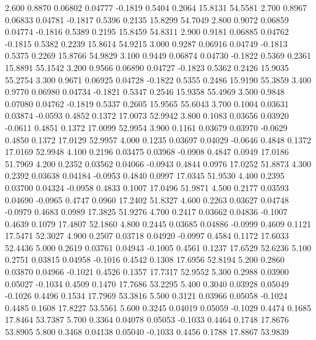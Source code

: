    2.600   0.8870   0.06802   0.04777  -0.1819   0.5404   0.2064  15.8131  54.5581
   2.700   0.8967   0.06833   0.04781  -0.1817   0.5396   0.2135  15.8299  54.7049
   2.800   0.9072   0.06859   0.04774  -0.1816   0.5389   0.2195  15.8459  54.8311
   2.900   0.9181   0.06885   0.04762  -0.1815   0.5382   0.2239  15.8614  54.9215
   3.000   0.9287   0.06916   0.04749  -0.1813   0.5375   0.2269  15.8766  54.9829
   3.100   0.9449   0.06874   0.04730  -0.1822   0.5369   0.2361  15.8891  55.1542
   3.200   0.9566   0.06890   0.04727  -0.1823   0.5362   0.2426  15.9035  55.2754
   3.300   0.9671   0.06925   0.04728  -0.1822   0.5355   0.2486  15.9190  55.3859
   3.400   0.9770   0.06980   0.04734  -0.1821   0.5347   0.2546  15.9358  55.4969
   3.500   0.9848   0.07080   0.04762  -0.1819   0.5337   0.2605  15.9565  55.6043
   3.700   0.1004   0.03631   0.03874  -0.0593   0.4852   0.1372  17.0073  52.9942
   3.800   0.1083   0.03656   0.03920  -0.0611   0.4851   0.1372  17.0099  52.9954
   3.900   0.1161   0.03679   0.03970  -0.0629   0.4850   0.1372  17.0129  52.9957
   4.000   0.1235   0.03697   0.04029  -0.0646   0.4848   0.1372  17.0169  52.9948
   4.100   0.2196   0.03475   0.03968  -0.0908   0.4847   0.0949  17.0186  51.7969
   4.200   0.2352   0.03562   0.04066  -0.0943   0.4844   0.0976  17.0252  51.8873
   4.300   0.2392   0.03638   0.04184  -0.0953   0.4840   0.0997  17.0345  51.9530
   4.400   0.2395   0.03700   0.04324  -0.0958   0.4833   0.1007  17.0496  51.9871
   4.500   0.2177   0.03593   0.04690  -0.0965   0.4747   0.0960  17.2402  51.8327
   4.600   0.2263   0.03627   0.04748  -0.0979   0.4683   0.0989  17.3825  51.9276
   4.700   0.2417   0.03662   0.04836  -0.1007   0.4639   0.1079  17.4807  52.1860
   4.800   0.2445   0.03685   0.04886  -0.0999   0.4609   0.1121  17.5471  52.3027
   4.900   0.2507   0.03718   0.04920  -0.0997   0.4584   0.1172  17.6033  52.4436
   5.000   0.2619   0.03761   0.04943  -0.1005   0.4561   0.1237  17.6529  52.6236
   5.100   0.2751   0.03815   0.04958  -0.1016   0.4542   0.1308  17.6956  52.8194
   5.200   0.2860   0.03870   0.04966  -0.1021   0.4526   0.1357  17.7317  52.9552
   5.300   0.2988   0.03900   0.05027  -0.1034   0.4509   0.1470  17.7686  53.2295
   5.400   0.3040   0.03928   0.05049  -0.1026   0.4496   0.1534  17.7969  53.3816
   5.500   0.3121   0.03966   0.05058  -0.1024   0.4485   0.1608  17.8227  53.5561
   5.600   0.3245   0.04019   0.05059  -0.1029   0.4474   0.1685  17.8464  53.7387
   5.700   0.3364   0.04078   0.05053  -0.1033   0.4464   0.1748  17.8676  53.8905
   5.800   0.3468   0.04138   0.05040  -0.1033   0.4456   0.1788  17.8867  53.9839
